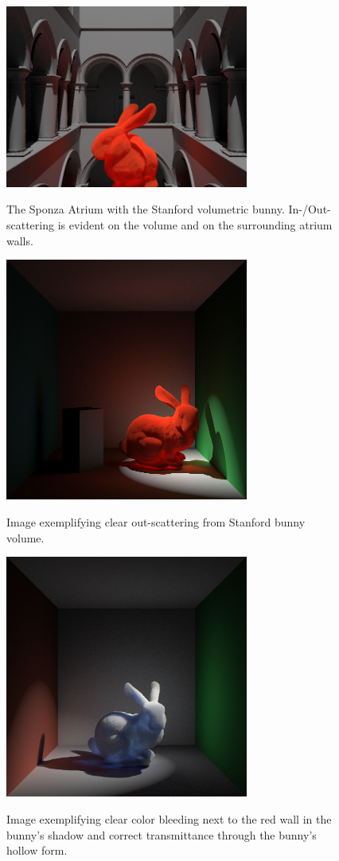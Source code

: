\documentclass[12pt]{ucthesis}
\newcommand{\captionfonts}{\small\bf\ssp}
\begin{document}
\begin{figure}[h!]
    \centering
    \includegraphics[width=80mm]{img/sponza.png}
    \captionfonts
    \caption{The Sponza Atrium with the Stanford volumetric bunny.  In-/Out-scattering is evident on the volume and on the surrounding atrium walls.}
\end{figure}

\begin{figure}[h!]
    \centering
    \includegraphics[width=80mm]{img/ketchup_good_corrected.png}
    \captionfonts
    \caption{Image exemplifying clear out-scattering from Stanford bunny volume.}
\end{figure}

\begin{figure}[h!]
    \centering
    \includegraphics[width=80mm]{img/bunny_spot/spot_right_new.png}
    \captionfonts
    \caption{Image exemplifying clear color bleeding next to the red wall in the bunny's shadow and correct transmittance through the bunny's hollow form.}
\end{figure}
\end{document}
